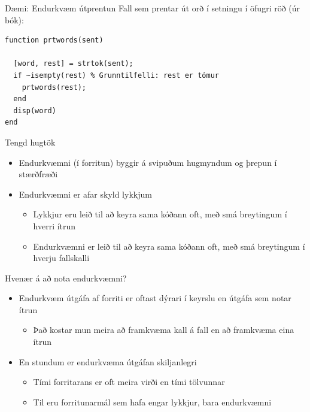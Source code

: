 \documentclass{beamer}
\begin{document}
\begin{frame}[fragile]{Dæmi: Endurkvæm útprentun}
Fall sem prentar út orð í setningu í öfugri röð (úr bók):
\begin{verbatim}
function prtwords(sent)

  [word, rest] = strtok(sent);
  if ~isempty(rest) % Grunntilfelli: rest er tómur
    prtwords(rest);
  end
  disp(word)
end
\end{verbatim}
\end{frame}

\begin{frame}{Tengd hugtök}
\begin{itemize}
 \item Endurkvæmni (í forritun) byggir á svipuðum hugmyndum og þrepun í stærðfræði
 \item Endurkvæmni er afar skyld lykkjum
 \begin{itemize}
  \item Lykkjur eru leið til að keyra sama kóðann oft, með smá breytingum í hverri ítrun
  \item Endurkvæmni er leið til að keyra sama kóðann oft, með smá breytingum í hverju fallskalli
 \end{itemize}
\end{itemize}

\end{frame}

\begin{frame}{Hvenær á að nota endurkvæmni?}
\begin{itemize}
 \item Endurkvæm útgáfa af forriti er oftast dýrari í keyrslu en útgáfa sem notar ítrun
 \begin{itemize}
  \item Það kostar mun meira að framkvæma kall á fall en að framkvæma eina ítrun
 \end{itemize}
 \item En stundum er endurkvæma útgáfan skiljanlegri
 \begin{itemize}
  \item Tími forritarans er oft meira virði en tími tölvunnar
  \item Til eru forritunarmál sem hafa engar lykkjur, bara endurkvæmni
 \end{itemize}
\end{itemize}
\end{frame}
\end{document}
